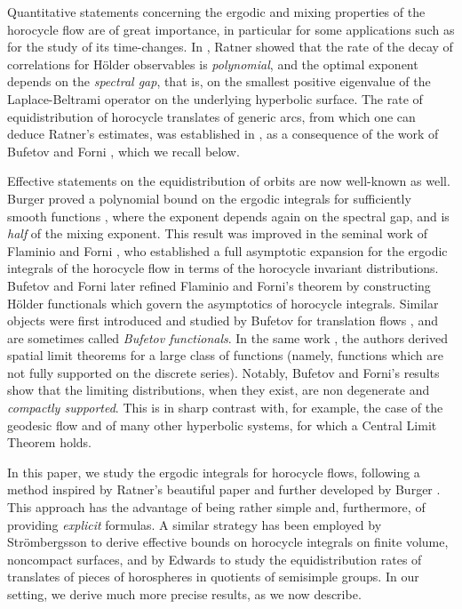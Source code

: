Quantitative statements concerning the ergodic and mixing properties of the horocycle flow are of great importance, in particular for some applications such as for the study of its time-changes.
In \cite{Rat1}, Ratner showed that the rate of the decay of correlations for Hölder observables is \emph{polynomial}, and the optimal exponent depends on the \emph{spectral gap}, that is, on the smallest positive eigenvalue of the Laplace-Beltrami operator on the underlying hyperbolic surface. The rate of equidistribution of horocycle translates of generic arcs, from which one can deduce Ratner's estimates, was established in \cite{Rav}, as a consequence of the work of Bufetov and Forni \cite{BuFo}, which we recall below.

Effective statements on the equidistribution of orbits are now well-known as well.
Burger proved a polynomial bound on the ergodic integrals for sufficiently smooth functions \cite{Bur}, where the exponent depends again on the spectral gap, and is \emph{half} of the mixing exponent.
This result was improved in the seminal work of Flaminio and Forni \cite{FlaFo}, who established a full asymptotic expansion for the ergodic integrals of the horocycle flow in terms of the horocycle invariant distributions.
Bufetov and Forni \cite{BuFo} later refined Flaminio and Forni's theorem by constructing Hölder functionals which govern the asymptotics of horocycle integrals.
Similar objects were first introduced and studied by Bufetov for translation flows \cite{Buf}, and are sometimes called \emph{Bufetov functionals}.
In the same work \cite{BuFo}, the authors derived spatial limit theorems for a large class of functions (namely, functions which are not fully supported on the discrete series).
Notably, Bufetov and Forni's results show that the limiting distributions, when they exist, are non degenerate and \emph{compactly supported}. This is in sharp contrast with, for example, the case of the geodesic flow and of many other hyperbolic systems, for which a Central Limit Theorem holds.

In this paper, we study the ergodic integrals for horocycle flows, following a method inspired by Ratner's beautiful paper \cite{Rat1} and further developed by Burger \cite{Bur}. This approach has the advantage of being rather simple and, furthermore, of providing \emph{explicit} formulas. A similar strategy has been employed by Strömbergsson \cite{Str} to derive effective bounds on horocycle integrals on finite volume, noncompact surfaces, and by Edwards \cite{Edw} to study the equidistribution rates of translates of pieces of horospheres in quotients of semisimple groups. In our setting, we derive much more precise results, as we now describe.\enlargethispage{\baselineskip}


